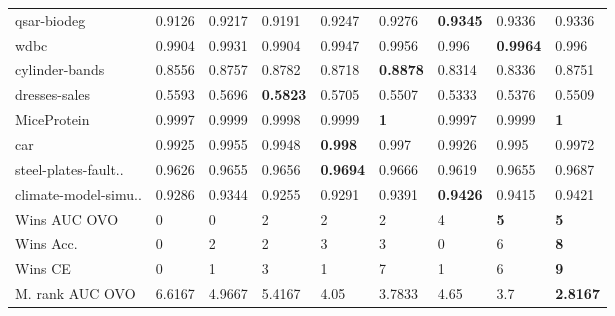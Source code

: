 \begin{tabular}{@{\hskip 0mm}
l@{\hskip 1mm}
l@{\hskip 1mm}
l@{\hskip 1mm}
l@{\hskip 1mm}
l@{\hskip 1mm}
l@{\hskip 1mm}
l@{\hskip 1mm}
l@{\hskip 1mm}
l@{\hskip 0mm}}
qsar-biodeg          &          0.9126 &          0.9217 &           0.9191 &           0.9247 &                  0.9276 &  \textbf{0.9345} &           0.9336 &                    0.9336 \\
wdbc                 &          0.9904 &          0.9931 &           0.9904 &           0.9947 &                  0.9956 &            0.996 &  \textbf{0.9964} &                     0.996 \\
cylinder-bands       &          0.8556 &          0.8757 &           0.8782 &           0.8718 &         \textbf{0.8878} &           0.8314 &           0.8336 &                    0.8751 \\
dresses-sales        &          0.5593 &          0.5696 &  \textbf{0.5823} &           0.5705 &                  0.5507 &           0.5333 &           0.5376 &                    0.5509 \\
MiceProtein          &          0.9997 &          0.9999 &           0.9998 &           0.9999 &              \textbf{1} &           0.9997 &           0.9999 &                \textbf{1} \\
car                  &          0.9925 &          0.9955 &           0.9948 &   \textbf{0.998} &                   0.997 &           0.9926 &            0.995 &                    0.9972 \\
steel-plates-fault.. &          0.9626 &          0.9655 &           0.9656 &  \textbf{0.9694} &                  0.9666 &           0.9619 &           0.9655 &                    0.9687 \\
climate-model-simu.. &          0.9286 &          0.9344 &           0.9255 &           0.9291 &                  0.9391 &  \textbf{0.9426} &           0.9415 &                    0.9421 \\
\midrule
Wins AUC OVO
                                         &               0 &               0 &                2 &                2 &                       2 &                4 &       \textbf{5} &                \textbf{5} \\
Wins Acc.            &               0 &               2 &                2 &                3 &                       3 &                0 &                6 &                \textbf{8} \\
Wins CE              &               0 &               1 &                3 &                1 &                       7 &                1 &                6 &                \textbf{9} \\
\midrule
M. rank AUC OVO
                                      &          6.6167 &          4.9667 &           5.4167 &             4.05 &                  3.7833 &             4.65 &              3.7 &           \textbf{2.8167} \\

\end{tabular}
